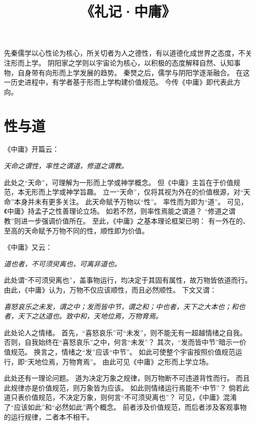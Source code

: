 \documentclass[11pt]{article}
\title{《礼记·中庸》}
\author{}
\date{}
\begin{document}
  \maketitle

  \linenumbers
先秦儒学以心性论为核心，所关切者为人之德性，有以道德化成世界之态度，不关注形而上学。
阴阳家之学则以宇宙论为核心，以积极的态度解释自然、认知事物，自身带有向形而上学发展的趋势。
秦燹之后，儒学与阴阳学逐渐融合。
在这一历史进程中，有学者基于形而上学构建价值规范。
今传《中庸》即代表此方向。

\section{性与道}
《中庸》开篇云：

\textit{天命之谓性，率性之谓道，修道之谓教。}

此处之“天命”，可理解为一形而上学或神学概念。
但《中庸》主旨在于价值规范，本无形而上学或神学旨趣。
立一“天命”，仅将其视为外在的价值根源，对“天命”本身并未有更多关注。
此天命赋予万物以“性”。
率性而为即为“道”。
可见，《中庸》持孟子之性善理论立场。
如若不然，则率性焉能之谓道？
“修道之谓教”则进一步强调价值所在。
至此，《中庸》之基本理论框架已明：
有一外在的、至高的天命赋予万物不同的性，顺性即为价值。

\par

《中庸》又云：

\textit{道也者，不可须臾离也，可离非道也。}

此处谓“不可须臾离也”，盖事物运行，均决定于其固有属性，故万物皆依道而行。
由此，《中庸》认为，万物不仅应该顺性，而且必然顺性。
下文又谓：

\textit{喜怒哀乐之未发，谓之中；发而皆中节，谓之和；中也者，天下之大本也；和也者，天下之达道也。致中和，天地位焉，万物育焉。}

此处论人之情绪。
首先，“喜怒哀乐”可“未发”，则不能无有一超越情绪之自我。
否则，自我始终在“喜怒哀乐”之中，何言“未发”？
其次，“发而皆中节”暗示一价值规范。
换言之，情绪之“发”应该“中节”。
如此可使整个宇宙按照价值规范运行，即“天地位焉，万物育焉”。
由此可见《中庸》之形而上学立场。

\par

此处还有一理论问题。
道为决定万象之规律，则万物断不可违道背性而行。
而且此规律亦是价值规范，则万象皆为应该。
如此则情绪运行焉能不“中节”？
倘若此道只表价值规范，不决定万象，则何言“不可须臾离也”？
可见，《中庸》混淆了“应该如此”和“必然如此”两个概念。
前者涉及价值规范，而后者涉及客观事物的运行规律，二者本不相干。
\end{document}
